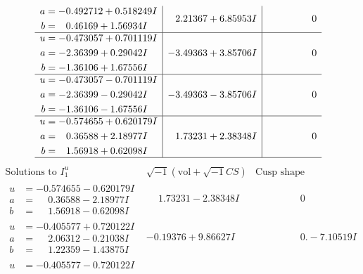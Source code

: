 \documentclass[1p]{elsarticle_modified}
\theoremstyle{definition}
\newcommand{\I}{\sqrt{-1}}
\begin{document}
$$\begin{array}{c|c|c}
\begin{aligned}
a &= -0.492712 + 0.518249 I \\
b &= \phantom{-}0.46169 + 1.56934 I\end{aligned}
 & \phantom{-}2.21367 + 6.85953 I & \phantom{-0.000000 } 0 \\ \hline\begin{aligned}
u &= -0.473057 + 0.701119 I \\
a &= -2.36399 + 0.29042 I \\
b &= -1.36106 + 1.67556 I\end{aligned}
 & -3.49363 + 3.85706 I & \phantom{-0.000000 } 0 \\ \hline\begin{aligned}
u &= -0.473057 - 0.701119 I \\
a &= -2.36399 - 0.29042 I \\
b &= -1.36106 - 1.67556 I\end{aligned}
 & -3.49363 - 3.85706 I & \phantom{-0.000000 } 0 \\ \hline\begin{aligned}
u &= -0.574655 + 0.620179 I \\
a &= \phantom{-}0.36588 + 2.18977 I \\
b &= \phantom{-}1.56918 + 0.62098 I\end{aligned}
 & \phantom{-}1.73231 + 2.38348 I & \phantom{-0.000000 } 0\\
 \hline 
 \end{array}$$\newpage$$\begin{array}{c|c|c}  
\text{Solutions to }I^u_{1}& \I (\text{vol} + \sqrt{-1}CS) & \text{Cusp shape}\\
 \hline 
\begin{aligned}
u &= -0.574655 - 0.620179 I \\
a &= \phantom{-}0.36588 - 2.18977 I \\
b &= \phantom{-}1.56918 - 0.62098 I\end{aligned}
 & \phantom{-}1.73231 - 2.38348 I & \phantom{-0.000000 } 0 \\ \hline\begin{aligned}
u &= -0.405577 + 0.720122 I \\
a &= \phantom{-}2.06312 - 0.21038 I \\
b &= \phantom{-}1.22359 - 1.43875 I\end{aligned}
 & -0.19376 + 9.86627 I & \phantom{-0.000000 } 0. - 7.10519 I \\ \hline\begin{aligned}
u &= -0.405577 - 0.720122 I \\

\end{aligned}
\end{array}$$
\end{document}
